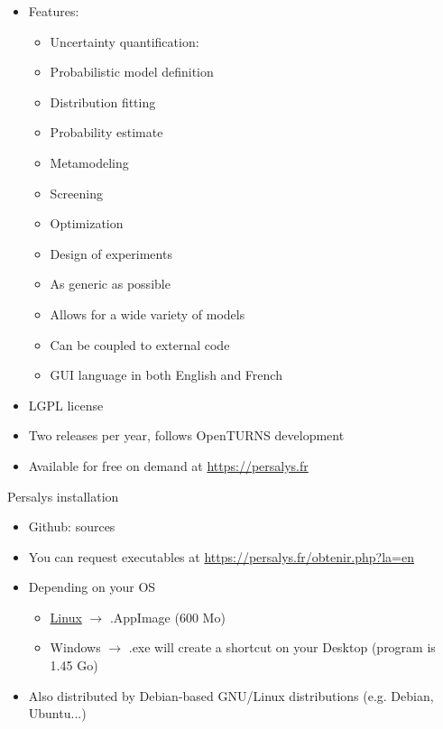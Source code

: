 \documentclass{beamer}
\begin{document}
  \begin{frame}{}
  \protect\hypertarget{section}{}
  \begin{itemize}
  
  \item
    Features:
  
    \begin{itemize}
    
    \item
      Uncertainty quantification:
    \item
      Probabilistic model definition
    \item
      Distribution fitting
    \item
      Probability estimate
    \item
      Metamodeling
    \item
      Screening
    \item
      Optimization
    \item
      Design of experiments
    \item
      As generic as possible
  
      
      \item
        Allows for a wide variety of models
      \item
        Can be coupled to external code
    \item
      GUI language in both English and French
    \end{itemize}
  \item
    LGPL license
  \item
    Two releases per year, follows OpenTURNS development
  \item
    Available for free on demand at
    \url{https://persalys.fr}
  
  \end{itemize}
  \end{frame}
  
  \begin{frame}{Persalys installation}
  \protect\hypertarget{persalys-installation}{}
  \begin{itemize}
  
  \item
    Github: sources
  \item
    You can request executables at
    \url{https://persalys.fr/obtenir.php?la=en}
  \item
    Depending on your OS
  
    \begin{itemize}
    
    \item
      \href{https://openturns.github.io/openturns/1.22/usecases/use_case_logistic.html}{Linux} $\rightarrow$ .AppImage (600 Mo)
    \item
      Windows $\rightarrow$ .exe will create a shortcut on your Desktop
      (program is 1.45 Go)
    \end{itemize}
    \item Also distributed by Debian-based GNU/Linux distributions (e.g. Debian, Ubuntu...)
  \end{itemize}
  \end{frame}
\end{document}
